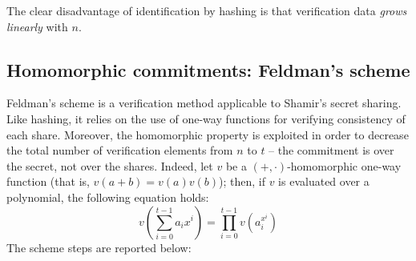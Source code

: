 \documentclass[10pt,journal,cspaper,compsoc]{IEEEtran}
\begin{document}
The clear disadvantage of identification by hashing is that verification data \emph{grows linearly} with $n$.


\subsection{Homomorphic commitments: Feldman's scheme}
\label{feldmanvss}
Feldman's scheme \cite{Feldman} is a verification method applicable to Shamir's secret sharing.
Like hashing, it relies on the use of one-way functions for verifying
consistency of each share. Moreover, the homomorphic property is exploited in order to decrease
the total number of verification elements from $n$ to $t$ -- the commitment is over the secret, not over the shares.
Indeed, let $v$ be a $(+,\cdot)$-homomorphic
one-way function (that is, $v(a+b)=v(a)v(b)$); then, if $v$ is evaluated over a polynomial, the following
equation holds:
\begin{equation}
v\left( {\mathop \sum \limits_{i = 0}^{t - 1} {a_i}{x^i}} \right) = \mathop \prod \limits_{i = 0}^{t - 1} v\left( {a_i^{{x^i}}} \right)
\end{equation}
The scheme steps are reported below:
\end{document}
